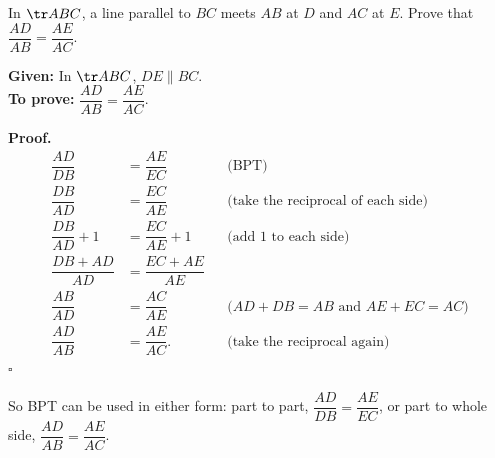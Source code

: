 \begin{example}
In $\tr ABC$, a line parallel to $BC$ meets $AB$ at $D$ and $AC$ at $E$. Prove that $\dfrac{AD}{AB}=\dfrac{AE}{AC}$.


\textbf{Given:} In $\tr ABC$, $DE\parallel BC$.\\
\textbf{To prove:} $\dfrac{AD}{AB}=\dfrac{AE}{AC}$.

\textbf{Proof.}
\[
\begin{aligned}
\dfrac{AD}{DB}&=\dfrac{AE}{EC} &&\text{(BPT)}\\
\dfrac{DB}{AD}&=\dfrac{EC}{AE} &&\text{(take the reciprocal of each side)}\\
\dfrac{DB}{AD}+1&=\dfrac{EC}{AE}+1 &&\text{(add $1$ to each side)}\\
\dfrac{DB+AD}{AD}&=\dfrac{EC+AE}{AE}\\
\dfrac{AB}{AD}&=\dfrac{AC}{AE} &&\text{($AD+DB=AB$ and $AE+EC=AC$)}\\
\dfrac{AD}{AB}&=\dfrac{AE}{AC}. &&\text{(take the reciprocal again)}
\end{aligned}
\]
\hfill$\square$
\end{example}

So BPT can be used in either form: part to part, $\dfrac{AD}{DB}=\dfrac{AE}{EC}$, or part to whole side, $\dfrac{AD}{AB}=\dfrac{AE}{AC}$.

